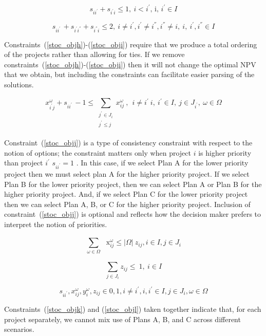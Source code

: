 \begin{equation}\label{stoc_objh}
s_{ii^{'}}+s_{i^{'}i} \leq 1,~ i<i^{'}\text{, i, }i^{'} \in I
\end{equation}

\begin{equation}\label{stoc_obji}
s_{ii^{'}~}+s_{i^{'}i^{''}}+s_{i^{''}i} \leq 2,~ i \neq i^{'},i^{'} \neq  i^{''},i^{''} \neq i,~i,~i^{'},i^{''} \in I
\end{equation}

Constraints~(\ref{stoc_objh})-(\ref{stoc_obji}) require that we produce a total ordering of the
projects rather than allowing for ties. If we remove constraints~(\ref{stoc_objh})-(\ref{stoc_obji})
then it will not change the optimal NPV that we obtain, but including the constraints can facilitate
easier parsing of the solutions.\par

\begin{equation}\label{stoc_objj}
x_{i^{'}j}^{ \omega }+s_{ii^{'}~}-1 \leq  \sum _{\begin{array}{c}
	j^{'} \in J_{i}\\
	j^{'} \leq j~\\
	\end{array}}^{}x_{ij}^{ \omega }~,~~i \neq i^{'}~i,~i^{'} \in I,~j \in J_{i^{'}},~ \omega  \in  \Omega
\end{equation}


Constraint~(\ref{stoc_objj}) is a type of consistency constraint with respect to the notion of
options; the constraint matters only when project  $i$  is higher priority than project
$i^{'}$ $s_{ii^{'}}=1$ . In this case, if we select Plan A for the lower priority project
then we must select plan A for the higher priority project. If we select Plan B for the lower
priority project, then we can select Plan A or Plan B for the higher priority project. And,
if we select Plan C for the lower priority project then we can select Plan A, B, or C for the
higher priority project. Inclusion of constraint~(\ref{stoc_objj}) is optional and reflects
how the decision maker prefers to interpret the notion of priorities.

\begin{equation}\label{stoc_objk}
 \sum _{ \omega  \in  \Omega }^{}\text{~ x}_{ij}^{ \omega } \leq   \vert  \Omega  \vert ~z_{ij} ,i \in I, j \in J_{i}
\end{equation}

\begin{equation}\label{stoc_objl}
 \sum _{j \in J_{i}}^{}z_{ij} \leq ~1,~  i \in I
\end{equation}

\begin{equation}\label{stoc_objm}
s_{ii^{'}},x_{ij}^{ \omega },y_{i}^{ \omega },z_{ij} \in { 0,1 } , i \neq i^{'},i,i^{'} \in I, j \in J_{i} ,  \omega  \in  \Omega
\end{equation}

Constraints~(\ref{stoc_objk}) and (\ref{stoc_objl}) taken together indicate that, for each
project separately, we cannot mix use of Plans A, B, and C across different scenarios.
